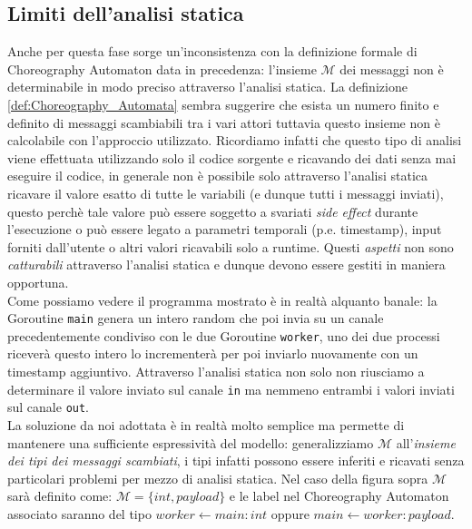 \subsection{Limiti dell'analisi statica} \label{subsec:Static_Analysis_Limits}
Anche per questa fase sorge un'inconsistenza con la definizione formale di Choreography Automaton data in precedenza: l'insieme $\mathcal{M}$ dei messaggi non è determinabile in modo preciso attraverso l'analisi statica. La definizione \ref{def:Choreography_Automata} sembra suggerire che esista un numero finito e definito di messaggi scambiabili tra i vari attori tuttavia questo insieme non è calcolabile con l'approccio utilizzato.
Ricordiamo infatti che questo tipo di analisi viene effettuata utilizzando solo il codice sorgente e ricavando dei dati senza mai eseguire il codice, in generale non è possibile solo attraverso l'analisi statica ricavare il valore esatto di tutte le variabili (e dunque tutti i messaggi inviati), questo perchè tale valore può essere soggetto a svariati \emph{side effect} durante l'esecuzione o può essere legato a parametri temporali (p.e. timestamp), input forniti dall'utente o altri valori ricavabili solo a runtime. Questi \emph{aspetti} non sono \emph{catturabili} attraverso l'analisi statica e dunque devono essere  gestiti in maniera opportuna.\\

\bigskip
Come possiamo vedere il programma mostrato è in realtà alquanto banale: la Goroutine \texttt{main} genera un intero random che poi invia su un canale precedentemente condiviso con le due Goroutine \texttt{worker}, uno dei due processi riceverà questo intero lo incrementerà per poi inviarlo nuovamente con un timestamp aggiuntivo. Attraverso l'analisi statica non solo non riusciamo a determinare il valore inviato sul canale \texttt{in} ma nemmeno entrambi i valori inviati sul canale \texttt{out}. \bigskip \\
La soluzione da noi adottata è in realtà molto semplice ma permette di mantenere una sufficiente espressività del modello: generalizziamo $\mathcal{M}$ all'\emph{insieme dei tipi dei messaggi scambiati}, i tipi infatti possono essere inferiti e ricavati senza particolari problemi per mezzo di analisi statica. Nel caso della figura sopra $\mathcal{M}$ sarà definito come: $\mathcal{M} = \{ int, payload \}$ e le label nel Choreography Automaton associato saranno del tipo $worker \leftarrow main : int$ oppure $main \leftarrow worker : payload$.

